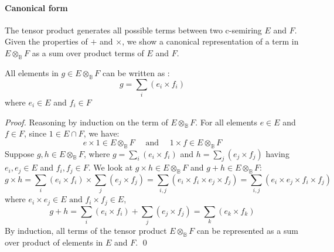 \paragraph{Canonical form} The tensor product generates all possible terms between two c-semiring $E$ and $F$. Given the properties of $+$ and $\times$, we show a canonical representation of a term in $E\otimes_{\mathbb{B}} F$ as a sum over product terms of $E$ and $F$. 

\begin{lemma}
	All elements in $g \in E \otimes_{\mathbb{B}} F$ can be written as :
	$$
	g = \sum_i (e_i \times f_i)
	$$
	where $e_i \in E$ and $f_i \in F$
\end{lemma}
\begin{proof}
	Reasoning by induction on the term of $E \otimes_{\mathbb{B}} F$. For all elements $e\in E$ and $f\in F$, since $1 \in E \cap F$, we have:
	$$
	e \times 1 \in E \otimes_{\mathbb{B}} F \quad \text{ and } \quad	1 \times f \in E \otimes_{\mathbb{B}} F
	$$
	Suppose $g,h \in E\otimes_{\mathbb{B}} F$, where $g = \sum_i (e_i \times f_i)$ and $h = \sum_j (e_j \times f_j)$ having $e_i,e_j \in E$ and $f_i,f_j \in F$. We look at $g\times h \in E\otimes_{\mathbb{B}} F$ and $g + h \in E\otimes_{\mathbb{B}} F$:
	$$g \times h = \sum_i (e_i \times f_i) \times \sum_j (e_j \times f_j) = \sum_{i,j} (e_i \times f_i \times e_j \times f_j) = \sum_{i,j} (e_i \times e_j \times f_i \times f_j)$$
	where	$e_i \times e_j \in E  \text{ and }  f_i \times f_j \in E$,
	$$ g + h = \sum_i (e_i \times f_i) + \sum_j (e_j \times f_j) = \sum_{k} (e_k \times f_k)$$
	By induction, all terms of the tensor product $E \otimes_{\mathbb{B}} F$ can be represented as a sum over product of elements in $E$ and $F$. \qed
\end{proof}


